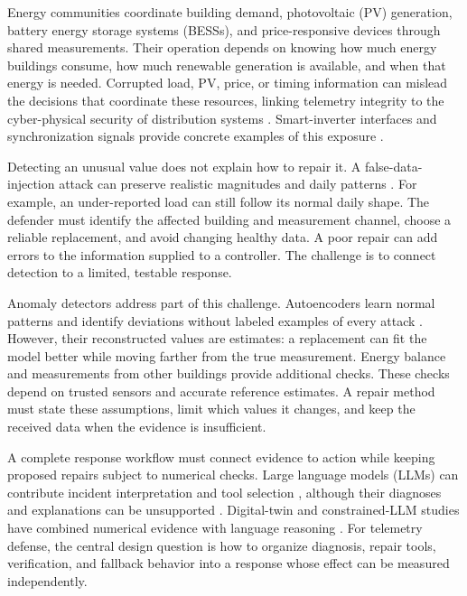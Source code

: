 \documentclass[conference]{IEEEtran}
\begin{document}
Energy communities coordinate building demand, photovoltaic (PV) generation, battery energy storage systems (BESSs), and price-responsive devices through shared measurements. Their operation depends on knowing how much energy buildings consume, how much renewable generation is available, and when that energy is needed. Corrupted load, PV, price, or timing information can mislead the decisions that coordinate these resources, linking telemetry integrity to the cyber-physical security of distribution systems \cite{citylearnv2,khalaf2024survey}. Smart-inverter interfaces and synchronization signals provide concrete examples of this exposure \cite{mccarthy2024smartinverters,zhang2013time}.

Detecting an unusual value does not explain how to repair it. A false-data-injection attack can preserve realistic magnitudes and daily patterns \cite{liu2011false}. For example, an under-reported load can still follow its normal daily shape. The defender must identify the affected building and measurement channel, choose a reliable replacement, and avoid changing healthy data. A poor repair can add errors to the information supplied to a controller. The challenge is to connect detection to a limited, testable response.

Anomaly detectors address part of this challenge. Autoencoders learn normal patterns and identify deviations without labeled examples of every attack \cite{zideh2024aae}. However, their reconstructed values are estimates: a replacement can fit the model better while moving farther from the true measurement. Energy balance and measurements from other buildings provide additional checks. These checks depend on trusted sensors and accurate reference estimates. A repair method must state these assumptions, limit which values it changes, and keep the received data when the evidence is insufficient.

A complete response workflow must connect evidence to action while keeping proposed repairs subject to numerical checks. Large language models (LLMs) can contribute incident interpretation and tool selection \cite{majumder2024llm,liu2025agents}, although their diagnoses and explanations can be unsupported \cite{ruan2024threats}. Digital-twin and constrained-LLM studies have combined numerical evidence with language reasoning \cite{srivastava2024twins,kampourakis2026}. For telemetry defense, the central design question is how to organize diagnosis, repair tools, verification, and fallback behavior into a response whose effect can be measured independently.
\end{document}

